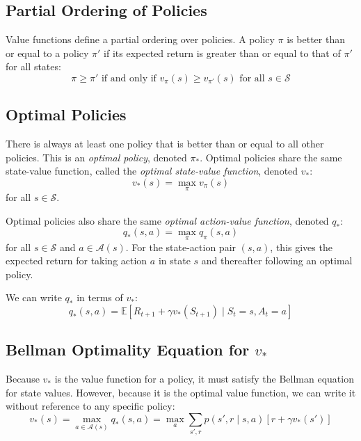 \documentclass[12pt]{article}
\begin{document}
\subsection{Partial Ordering of Policies}

Value functions define a partial ordering over policies. A policy $\pi$ is better than or equal to a policy $\pi'$ if its expected return is greater than or equal to that of $\pi'$ for all states:
\begin{equation}
\pi \ge \pi' \text{ if and only if } v_\pi(s) \ge v_{\pi'}(s) \text{ for all } s \in \mathcal{S}
\end{equation}

\subsection{Optimal Policies}

There is always at least one policy that is better than or equal to all other policies. This is an \textit{optimal policy}, denoted $\pi_*$. Optimal policies share the same state-value function, called the \textit{optimal state-value function}, denoted $v_*$:
\begin{equation}
v_*(s) = \max_\pi v_\pi(s)
\end{equation}
for all $s \in \mathcal{S}$.

Optimal policies also share the same \textit{optimal action-value function}, denoted $q_*$:
\begin{equation}
q_*(s, a) = \max_\pi q_\pi(s, a)
\end{equation}
for all $s \in \mathcal{S}$ and $a \in \mathcal{A}(s)$. For the state-action pair $(s, a)$, this gives the expected return for taking action $a$ in state $s$ and thereafter following an optimal policy.

We can write $q_*$ in terms of $v_*$:
\begin{equation}
q_*(s, a) = \mathbb{E}[R_{t+1} + \gamma v_*(S_{t+1}) \mid S_t = s, A_t = a]
\end{equation}

\subsection{Bellman Optimality Equation for $v_*$}

Because $v_*$ is the value function for a policy, it must satisfy the Bellman equation for state values. However, because it is the optimal value function, we can write it without reference to any specific policy:
\begin{equation}
v_*(s) = \max_{a \in \mathcal{A}(s)} q_*(s, a) = \max_a \sum_{s', r} p(s', r \mid s, a)[r + \gamma v_*(s')]
\end{equation}
\end{document}
